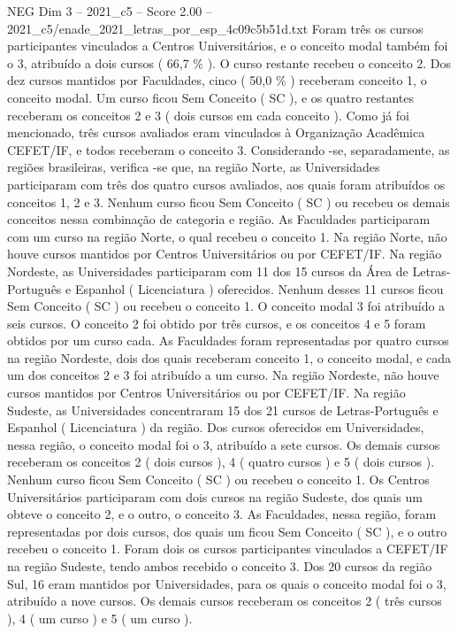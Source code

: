 \begin{textsample}{NEG Dim 3 – 2021\_c5 – Score 2.00 – 2021\_c5/enade\_2021\_letras\_por\_esp\_4c09c5b51d.txt}
Foram três os cursos participantes vinculados a Centros Universitários, e o conceito modal também foi o 3, atribuído a dois cursos ( 66,7 \% ).
O curso restante recebeu o conceito 2.
Dos dez cursos mantidos por Faculdades, cinco ( 50,0 \% ) receberam conceito 1, o conceito modal.
Um curso ficou Sem Conceito ( SC ), e os quatro restantes receberam os conceitos 2 e 3 ( dois cursos em cada conceito ).
Como já foi mencionado, três cursos avaliados eram vinculados à Organização Acadêmica CEFET/IF, e todos receberam o conceito 3.
Considerando -se, separadamente, as regiões brasileiras, verifica -se que, na região Norte, as Universidades participaram com três dos quatro cursos avaliados, aos quais foram atribuídos os conceitos 1, 2 e 3.
Nenhum curso ficou Sem Conceito ( SC ) ou recebeu os demais conceitos nessa combinação de categoria e região.
As Faculdades participaram com um curso na região Norte, o qual recebeu o conceito 1.
Na região Norte, não houve cursos mantidos por Centros Universitários ou por CEFET/IF.
Na região Nordeste, as Universidades participaram com 11 dos 15 cursos da Área de Letras-Português e Espanhol ( Licenciatura ) oferecidos.
Nenhum desses 11 cursos ficou Sem Conceito ( SC ) ou recebeu o conceito 1.
O conceito modal 3 foi atribuído a seis cursos.
O conceito 2 foi obtido por três cursos, e os conceitos 4 e 5 foram obtidos por um curso cada.
As Faculdades foram representadas por quatro cursos na região Nordeste, dois dos quais receberam conceito 1, o conceito modal, e cada um dos conceitos 2 e 3 foi atribuído a um curso.
Na região Nordeste, não houve cursos mantidos por Centros Universitários ou por CEFET/IF.
Na região Sudeste, as Universidades concentraram 15 dos 21 cursos de Letras-Português e Espanhol ( Licenciatura ) da região.
Dos cursos oferecidos em Universidades, nessa região, o conceito modal foi o 3, atribuído a sete cursos.
Os demais cursos receberam os conceitos 2 ( dois cursos ), 4 ( quatro cursos ) e 5 ( dois cursos ).
Nenhum curso ficou Sem Conceito ( SC ) ou recebeu o conceito 1.
Os Centros Universitários participaram com dois cursos na região Sudeste, dos quais um obteve o conceito 2, e o outro, o conceito 3.
As Faculdades, nessa região, foram representadas por dois cursos, dos quais um ficou Sem Conceito ( SC ), e o outro recebeu o conceito 1.
Foram dois os cursos participantes vinculados a CEFET/IF na região Sudeste, tendo ambos recebido o conceito 3.
Dos 20 cursos da região Sul, 16 eram mantidos por Universidades, para os quais o conceito modal foi o 3, atribuído a nove cursos.
Os demais cursos receberam os conceitos 2 ( três cursos ), 4 ( um curso ) e 5 ( um curso ).

\end{textsample}
